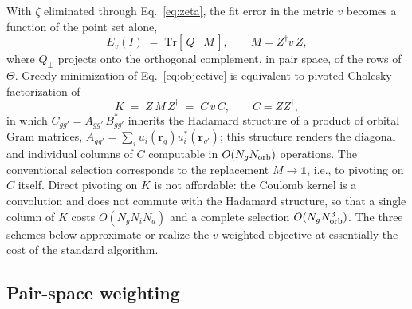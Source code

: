 \documentclass[aps,prb,twocolumn,superscriptaddress,amsmath,amssymb]{revtex4-2}
\newcommand{\rr}{\mathbf{r}}
\begin{document}
With $\zeta$ eliminated through Eq.~\eqref{eq:zeta}, the fit error in the
metric $v$ becomes a function of the point set alone,
\begin{equation}
  E_v(I) \;=\; \mathrm{Tr}\left[\, Q_\perp\, M \,\right],
  \qquad M = Z^{\dagger} v\, Z,
  \label{eq:objective}
\end{equation}
where $Q_\perp$ projects onto the orthogonal complement, in pair space, of
the rows of $\Theta$. Greedy minimization of Eq.~\eqref{eq:objective} is
equivalent to pivoted Cholesky factorization of
\begin{equation}
  K \;=\; Z\, M\, Z^{\dagger} \;=\; C\, v\, C, \qquad C = Z Z^{\dagger},
  \label{eq:K}
\end{equation}
in which $C_{gg'} = A_{gg'}\, B^{*}_{gg'}$ inherits the Hadamard structure
of a product of orbital Gram matrices,
$A_{gg'} = \sum_i u_i(\rr_g)u_i^{*}(\rr_{g'})$; this structure renders the
diagonal and individual columns of $C$ computable in $O(N_g N_{\rm orb})$
operations. The conventional selection corresponds to the replacement
$M \rightarrow \mathbb{1}$, i.e., to pivoting on $C$ itself. Direct
pivoting on $K$ is not affordable: the Coulomb kernel is a convolution and
does not commute with the Hadamard structure, so that a single column of
$K$ costs $O(N_g N_i N_a)$ and a complete selection
$O(N_g N_{\rm orb}^{3})$. The three schemes below approximate or realize
the $v$-weighted objective at essentially the cost of the standard
algorithm.

\subsection{Pair-space weighting}
\label{sec:knob1}
\end{document}
